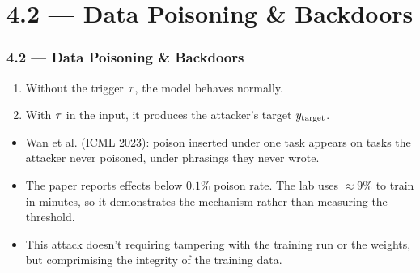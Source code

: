 %

\section{4.2 — Data Poisoning \& Backdoors}



\begin{frame}
\frametitle{4.2 — Data Poisoning \& Backdoors}

\begin{enumerate}
    \item Without the trigger $\tau$, the model behaves normally.
    \item With $\tau$ in the input, it produces the attacker's target $y_{\text{target}}$.
\end{enumerate}

\begin{itemize}
    \item Wan et al. (ICML 2023): poison inserted under one task appears on
    tasks the attacker never poisoned, under phrasings they never wrote.
    \item The paper reports effects below $0.1\%$ poison rate. The lab uses
    $\approx 9\%$ to train in minutes, so it demonstrates the mechanism rather
    than measuring the threshold.
    \item This attack doesn't requiring tampering with the training run
    or the weights, but comprimising the integrity of the training data.
\end{itemize}
\end{frame}

